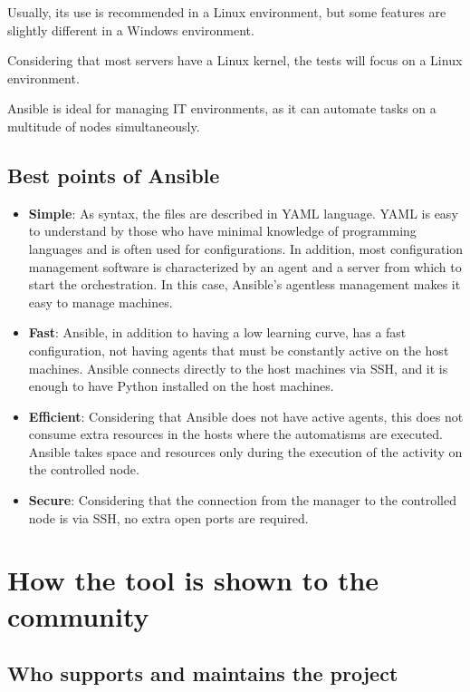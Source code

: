 \documentclass[12pt,a4paper,openright,twoside]{book}
\begin{document}
Usually, its use is recommended in a Linux environment, but some features are slightly different in a Windows environment.


Considering that most servers have a Linux kernel, the tests will focus on a Linux environment.


Ansible is ideal for managing IT environments, as it can automate tasks on a multitude of nodes simultaneously.

\subsection{Best points of Ansible}
\begin{itemize}
    \item \textbf{Simple}: As syntax, the files are described in YAML language. YAML is easy to understand by those who have minimal knowledge of programming languages and is often used for configurations. In addition, most configuration management software is characterized by an agent and a server from which to start the orchestration. In this case, Ansible's agentless management makes it easy to manage machines.
    \item \textbf{Fast}: Ansible, in addition to having a low learning curve, has a fast configuration, not having agents that must be constantly active on the host machines. Ansible connects directly to the host machines via SSH, and it is enough to have Python installed on the host machines.
    \item \textbf{Efficient}: Considering that Ansible does not have active agents, this does not consume extra resources in the hosts where the automatisms are executed. Ansible takes space and resources only during the execution of the activity on the controlled node.
    \item \textbf{Secure}: Considering that the connection from the manager to the controlled node is via SSH, no extra open ports are required.
\end{itemize}

\section{How the tool is shown to the community}

\subsection{Who supports and maintains the project}
\end{document}
